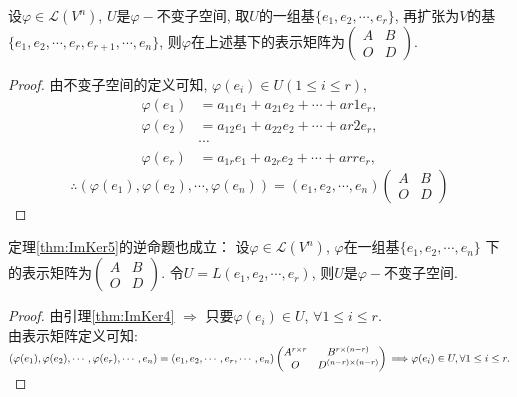 \begin{theorem}\label{thm:ImKer5}
  设$\varphi \in \mathcal{L}(V^n)$, $U$是$\varphi-\text{不变子空间}$,
  取$U$的一组基$\{e_1, e_2,\cdots,e_r\}$, 再扩张为$V$的基
  $\{e_1,e_2,\cdots,e_r,e_{r+1},\cdots,e_n\}$,
  则$\varphi$在上述基下的表示矩阵为$\left(\begin{smallmatrix}
    A & B\\
    O & D
    \end{smallmatrix}\right)$. 
\end{theorem}

\begin{proof}
  由不变子空间的定义可知, $\varphi(e_i) \in U (1 \leq i \leq r)$,
  \begin{align*}
    \varphi(e_1) & = a_{11}e_1 + a_{21}e_2 + \cdots + a{r1}e_r,\\
    \varphi(e_2) & = a_{12}e_1 + a_{22}e_2 + \cdots + a{r2}e_r,\\
                 & \cdots\\
    \varphi(e_r) & = a_{1r}e_1 + a_{2r}e_2 + \cdots + a{rr}e_r,
  \end{align*}
  \[\therefore (\varphi(e_1),\varphi(e_2),\cdots,\varphi(e_n)) =
    (e_1,e_2,\cdots,e_n)
    \begin{pmatrix}
      A & B\\
      O & D
    \end{pmatrix}\]
\end{proof}

\begin{notice}
  定理\ref{thm:ImKer5}的逆命题也成立：
  设$\varphi \in \mathcal{L}(V^n)$, $\varphi$在一组基$\{e_1,e_2,\cdots,e_n\}$
  下的表示矩阵为$\left(
    \begin{smallmatrix}
      A & B\\
      O & D
    \end{smallmatrix}\right)$. 令$U=L(e_1,e_2,\cdots,e_r)$,
  则$U$是$\varphi-\text{不变子空间}$. 
\end{notice}
\begin{proof}
  由引理\ref{thm:ImKer4} $\Longrightarrow $
  只要$\varphi(e_i) \in U$, $\forall 1 \leq i \leq r$. \\
  由表示矩阵定义可知: \\
  $(\varphi(e_1), \varphi(e_2), \cdots, \varphi(e_r), \cdots, e_n)
  = (e_1, e_2, \cdots, e_r, \cdots, e_n)
  \begin{pmatrix}
    A^{r \times r} & B^{r\times(n-r)}\\
    O & D^{(n-r)\times(n-r)}
  \end{pmatrix}\\
  \Longrightarrow \varphi(e_i) \in U, \forall 1 \leq i \leq r. $
\end{proof}

